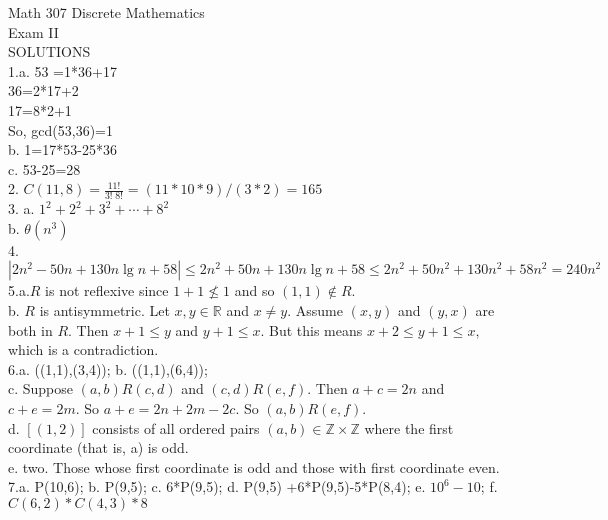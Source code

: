 \documentclass{amsart}
\newcommand{\real}{\mathbb{R}}
\newcommand{\z}{\mathbb{Z}}
\begin{document}
\noindent Math 307 Discrete Mathematics\\
Exam II \\
SOLUTIONS\\

1.a. 53 =1*36+17\\
36=2*17+2\\
17=8*2+1\\
So, gcd(53,36)=1\\

b. 1=17*53-25*36\\

c. 53-25=28\\

2. $C(11,8)=\frac{11!}{3! \; 8!}=(11*10*9)/(3*2)=165$\\

3. a. $1^2+2^2+3^2+ \cdots +8^2$\\

b. $\theta(n^3)$\\

4. $|2n^2-50n+ 130 n \lg n +58| \leq 2n^2+50n+130 n \lg n +58 \leq
2n^2 + 50n^2 +130 n^2+58n^2 = 240 n^2$\\

5.a.$R$ is not reflexive since $1 +1 \not \leq 1$ and so $(1,1) \not
\in R.$\\

b. $R$ is antisymmetric. Let $x,y \in \real$ and $ x \not = y.$
Assume $(x,y)$ and $(y,x)$ are both in $R.$ Then $x+1 \leq y$ and
$y+1 \leq x.$ But this means $x+2 \leq y+1 \leq x,$ which is a
contradiction.\\

6.a. ((1,1),(3,4)); b. ((1,1),(6,4));\\
c. Suppose $(a,b)R(c,d)$ and $(c,d)R(e,f).$ Then $a+c=2n$ and
$c+e=2m$. So $a+e=2n+2m-2c.$ So $(a,b)R(e,f).$\\

d. $[(1,2)]$ consists of all ordered pairs $(a,b) \in \z \times \z$
where the first coordinate (that is, a) is odd.\\

e. two. Those whose first coordinate is odd and those with first
coordinate even.\\

7.a. P(10,6); b. P(9,5); c. 6*P(9,5); d. P(9,5) +6*P(9,5)-5*P(8,4);
e. $10^6-10$; f. $C(6,2)*C(4,3)*8$
\end{document}
